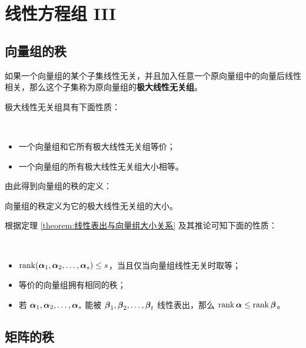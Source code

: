 \section{线性方程组 III}

\subsection{向量组的秩}

\begin{definition}[极大线性无关组]
	如果一个向量组的某个子集线性无关，并且加入任意一个原向量组中的向量后线性相关，那么这个子集称为原向量组的\textbf{极大线性无关组}。
\end{definition}

极大线性无关组具有下面性质：

\begin{property}
	\ 
	\begin{itemize}
		\item 一个向量组和它所有极大线性无关组等价；
		\item 一个向量组的所有极大线性无关组大小相等。
	\end{itemize}
\end{property}

由此得到向量组的秩的定义：

\begin{definition}[向量组的秩]
	向量组的秩定义为它的极大线性无关组的大小。
\end{definition}

根据定理 \ref{theorem:线性表出与向量组大小关系} 及其推论可知下面的性质：

\begin{property}
	\ 
	\begin{itemize}
		\item $\operatorname{rank}(\boldsymbol{\alpha}_1, \boldsymbol{\alpha}_2, \dots, \boldsymbol{\alpha}_s) \le s$，当且仅当向量组线性无关时取等；
		\item 等价的向量组拥有相同的秩；
		\item 若 $\boldsymbol{\alpha}_1, \boldsymbol{\alpha}_2, \dots, \boldsymbol{\alpha}_s$ 能被 $\boldsymbol{\beta}_1, \boldsymbol{\beta}_2, \dots, \boldsymbol{\beta}_t$ 线性表出，那么 $\operatorname{rank} \boldsymbol{\alpha} \le \operatorname{rank} \boldsymbol{\beta}$。
	\end{itemize}
\end{property}

\subsection{矩阵的秩}

